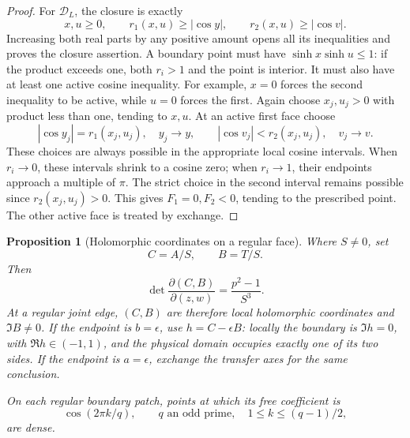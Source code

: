 \documentclass[11pt]{article}
\numberwithin{equation}{section}
\newtheorem{proposition}[theorem]{Proposition}
\theoremstyle{definition}
\newcommand{\DL}{\mathcal D_L}
\begin{document}
\begin{proof}
For \(\DL\), the closure is exactly
\begin{equation}\label{geo:LT-closure}
 x,u\geq0,\qquad r_1(x,u)\geq|\cos y|,\qquad
 r_2(x,u)\geq|\cos v|.
\end{equation}
Increasing both real parts by any positive amount opens
all its inequalities and proves the closure assertion.
A boundary point must have
\(\sinh x\sinh u\leq1\): if the product exceeds one,
both \(r_i>1\) and the point is interior.
It must also have at least one active cosine inequality.
For example, \(x=0\) forces the second inequality to be
active, while \(u=0\) forces the first.
Again choose \(x_j,u_j>0\) with product less than one,
tending to \(x,u\).  At an active first face choose
\[
 |\cos y_j|=r_1(x_j,u_j),\quad y_j\to y,
 \qquad
 |\cos v_j|<r_2(x_j,u_j),\quad v_j\to v .
 \]
These choices are always possible in the appropriate
local cosine intervals.  When \(r_i\to0\), these intervals
shrink to a cosine zero; when \(r_i\to1\), their endpoints
approach a multiple of \(\pi\).  The strict choice in the
second interval remains possible since \(r_2(x_j,u_j)>0\).
This gives \(F_1=0,F_2<0\), tending to the prescribed point.
The other active face is treated by exchange.
\end{proof}

\begin{proposition}[Holomorphic coordinates on a regular face]
\label{geo:local-coordinates}
Where \(S\ne0\), set
\[
                         C=A/S,\qquad B=T/S.
\]
Then
\begin{equation}\label{geo:Jacobian}
             \det\frac{\partial(C,B)}{\partial(z,w)}
                    =\frac{p^2-1}{S^3}.
\end{equation}
At a regular joint edge, \((C,B)\) are therefore local
holomorphic coordinates and \(\Im B\ne0\).
If the endpoint is \(b=\epsilon\), use
\(h=C-\epsilon B\): locally the boundary is
\(\Im h=0\), with \(\Re h\in(-1,1)\), and the physical
domain occupies exactly one of its two sides.
If the endpoint is \(a=\epsilon\), exchange the transfer
axes for the same conclusion.

On each regular boundary patch, points at which its free
coefficient is
\[
       \cos(2\pi k/q),\qquad q\text{ an odd prime},\quad
                         1\leq k\leq(q-1)/2,
\]
are dense.
\end{proposition}
\end{document}
